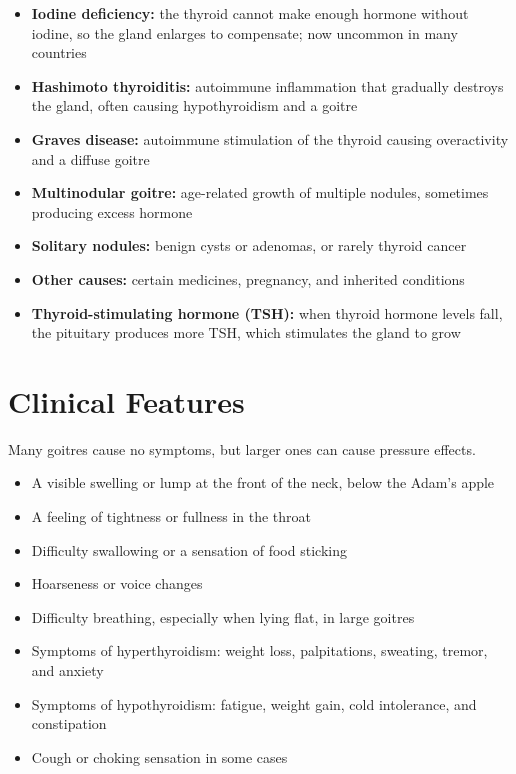 \begin{itemize}
    \item \textbf{Iodine deficiency:} the thyroid cannot make enough hormone without iodine, so the gland enlarges to compensate; now uncommon in many countries
    \item \textbf{Hashimoto thyroiditis:} autoimmune inflammation that gradually destroys the gland, often causing hypothyroidism and a goitre
    \item \textbf{Graves disease:} autoimmune stimulation of the thyroid causing overactivity and a diffuse goitre
    \item \textbf{Multinodular goitre:} age-related growth of multiple nodules, sometimes producing excess hormone
    \item \textbf{Solitary nodules:} benign cysts or adenomas, or rarely thyroid cancer
    \item \textbf{Other causes:} certain medicines, pregnancy, and inherited conditions
    \item \textbf{Thyroid-stimulating hormone (TSH):} when thyroid hormone levels fall, the pituitary produces more TSH, which stimulates the gland to grow
\end{itemize}

\section*{Clinical Features}
Many goitres cause no symptoms, but larger ones can cause pressure effects.

\begin{itemize}
    \item A visible swelling or lump at the front of the neck, below the Adam's apple
    \item A feeling of tightness or fullness in the throat
    \item Difficulty swallowing or a sensation of food sticking
    \item Hoarseness or voice changes
    \item Difficulty breathing, especially when lying flat, in large goitres
    \item Symptoms of hyperthyroidism: weight loss, palpitations, sweating, tremor, and anxiety
    \item Symptoms of hypothyroidism: fatigue, weight gain, cold intolerance, and constipation
    \item Cough or choking sensation in some cases
\end{itemize}

